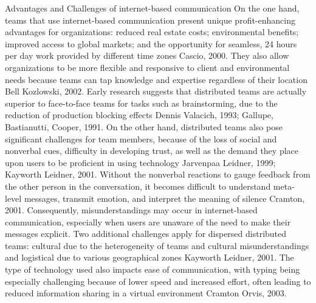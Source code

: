 Advantages and Challenges of internet-based communication
On the one hand, teams that use internet-based communication present unique profit-enhancing advantages for organizations: reduced real estate costs; environmental benefits; improved access to global markets; and the opportunity for seamless, 24 hours per day work provided by different time zones Cascio, 2000. They also allow organizations to be more flexible and responsive to client and environmental needs because teams can tap knowledge and expertise regardless of their location Bell  Kozlowski, 2002. Early research suggests that distributed teams are actually superior to face-to-face teams for tasks such as brainstorming, due to the reduction of production blocking effects Dennis  Valacich, 1993; Gallupe, Bastianutti,  Cooper, 1991.
On the other hand, distributed teams also pose significant challenges for team members, because of the loss of social and nonverbal cues, difficulty in developing trust, as well as the demand they place upon users to be proficient in using technology Jarvenpaa  Leidner, 1999; Kayworth  Leidner, 2001. Without the nonverbal reactions to gauge feedback from the other person in the conversation, it becomes difficult to understand meta-level messages, transmit emotion, and interpret the meaning of silence Cramton, 2001. 
Consequently, misunderstandings may occur in internet-based communication, especially when users are unaware of the need to make their messages explicit. Two additional challenges apply for dispersed distributed teams: cultural due to the heterogeneity of teams and cultural misunderstandings and logistical due to various geographical zones Kayworth  Leidner, 2001. The type of technology used also impacts ease of communication, with typing being especially challenging because of lower speed and increased effort, often leading to reduced information sharing in a virtual environment Cramton  Orvis, 2003.

